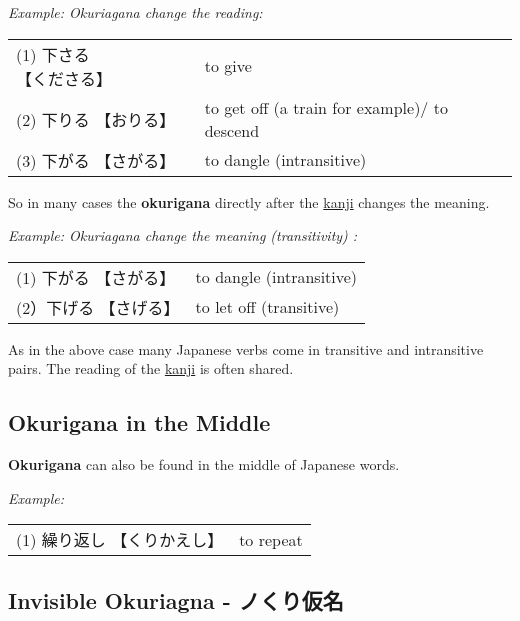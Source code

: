 \textit{Example: Okuriagana change the reading:}

\medskip
\begin{tabular}{ll}
\hspace{2cm}(1) {下さる} {【くださる】} & to give \\
\hspace{2cm}(2) {下りる} {【おりる】} &  to get off (a train for example)/ to descend \\
\hspace{2cm}(3) {下がる} {【さがる】} &  to dangle (intransitive)\\
\end{tabular}

\medskip
So in many cases the \textbf{okurigana} directly after the
\hyperref[sec:Kanji]{kanji} changes the meaning.

\textit{Example: Okuriagana change the meaning (transitivity) :}

\medskip
\begin{tabular}{ll}
\hspace{2cm}(1) {下がる} {【さがる】} &  to dangle (intransitive)\\
\hspace{2cm}(2）{下げる} {【さげる】} &  to let off (transitive)\\
\end{tabular}

\medskip
As in the above case many Japanese verbs come in transitive and intransitive
pairs. The reading of the \hyperref[sec:Kanji]{kanji} is often shared.

\subsection*{Okurigana in the Middle}

\textbf{Okurigana} can also be found in the middle of Japanese words.

\textit{Example:}

\begin{center}\begin{tabular}{ll}
(1) {繰り返し} {【くりかえし】} &  to repeat\\
\end{tabular}\end{center}

\subsection*{Invisible Okuriagna - ノくり仮名}

